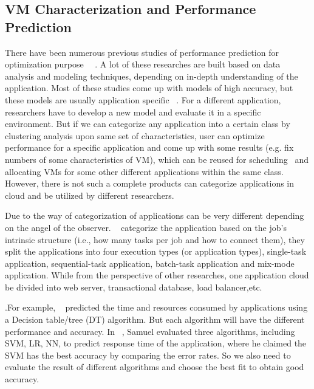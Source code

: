 \subsection{VM Characterization and Performance Prediction}


There have been numerous previous studies of performance prediction for optimization purpose~\cite{Yang2005} ~\cite{Matsunaga2010}. A lot of these researches are built based on data analysis and modeling techniques, depending on in-depth understanding of the application. Most of these studies come up with models of high accuracy, but these models are usually application specific ~\cite{Shan2008}. For a different application, researchers have to develop a new model and evaluate it in a specific environment. But if we can categorize any application into a certain class by clustering analysis upon same set of characteristics, user can optimize performance for a specific application and come up with some results (e.g. fix numbers of some characteristics of VM), which can be reused for scheduling ~\cite{OguraM10}and allocating VMs for some other different applications within the same class. However, there is not such a complete products can categorize applications in cloud and be utilized by different researchers.

Due to the way of categorization of applications can be very different depending on the angel of the observer. ~\cite{Derrick2014} categorize the application based on the job’s intrinsic structure (i.e., how many tasks per job and how to connect them), they split the applications into four execution types (or application types), single-task application, sequential-task application, batch-task application and mix-mode application. While from the perspective of other researches, one application cloud be divided into web server, transactional database, load balancer,etc.

.For example, ~\cite{Matsunaga2010} predicted the time and resources consumed by applications using a Decision table/tree (DT) algorithm. But each algorithm will have the different performance and accuracy. In ~\cite{Samuel2013}, Samuel evaluated three algorithms, including SVM, LR, NN, to predict response time of the application, where he claimed the SVM has the best accuracy by comparing the error rates. So we also need to evaluate the result of different algorithms and choose the best fit to obtain good accuracy.
